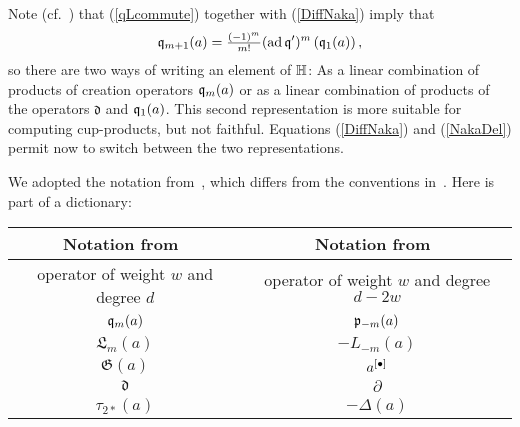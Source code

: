 \begin{remark}\label{HRep}
Note (cf.~\cite[Thm.~3.8]{LehnSorger}) that (\ref{qLcommute}) together with (\ref{DiffNaka}) imply that 
\begin{equation}\label{NakaDel}
\mathfrak{q}_{m+1}(a) = \tfrac{(-1)^m}{m!}(\operatorname{ad}\mathfrak{q}')^m\left(\mathfrak{q}_1(a)\right),
\end{equation}
so there are two ways of writing an element of $\mathbb{H}$: As a linear combination of products of creation operators $\mathfrak{q}_m(a)$ or as a linear combination of products of the operators $\mathfrak{d}$ and $\mathfrak{q}_1(a)$. This second representation is more suitable for computing cup-products, but not faithful. 
Equations (\ref{DiffNaka}) and (\ref{NakaDel}) permit now to switch between the two representations.
\end{remark}

\begin{remark}
We adopted the notation from~\cite{LiQinWang}, which differs from the conventions in~\cite{LehnSorger}. Here is part of a dictionary:
\begin{center}
\begin{tabular}{c|c} 
Notation from~\cite{LiQinWang} & Notation from~\cite{LehnSorger} \\\hline
operator of weight $w$ and degree $d$ & operator of weight $w$ and degree $d-2w$\\
$\mathfrak{q}_m(a) $ & $\mathfrak{p}_{-m}(a)$ \\
$ \mathfrak{L}_m(a) $ & $ - L_{-m}(a)$ \\
$\mathfrak{G}(a)$ & $a^{[\bullet]}$\\
$ \mathfrak{d} $ & $ \partial $ \\
$\tau_{2*}(a)$& $-\Delta(a)$
\end{tabular}
\end{center}
\end{remark}

